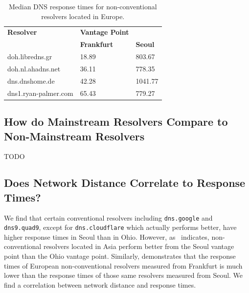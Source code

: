 \begin{table}
\centering
\begin{tabular}{lll}
\toprule
\textbf{Resolver} & \textbf{Vantage Point} & \\
                  & \textbf{Frankfurt}     & \textbf{Seoul} \\
\midrule
doh.libredns.gr      & 18.89                                                        & 803.67                                           \\
doh.nl.ahadns.net    & 36.11                                                        & 778.35                                           \\
dns.dnshome.de       & 42.28                                                        & 1041.77                                           \\ 
dns1.ryan-palmer.com & 65.43                                                        & 779.27                                           \\
\bottomrule
\end{tabular}
\caption{Median DNS response times for non-conventional resolvers located in Europe.}
\label{tab:UnconvEur}
\end{table}

\subsection{How do Mainstream Resolvers Compare to Non-Mainstream Resolvers}
TODO

\subsection{Does Network Distance Correlate to Response Times?}
We find that certain conventional resolvers including \texttt{dns.google} and \texttt{dns9.quad9}, except for \texttt{dns.cloudflare} which actually performs better, have higher response times in Seoul than in Ohio. 
However, as~ indicates, non-conventional resolvers located in Asia perform better from the Seoul vantage point than the Ohio vantage point. 
Similarly,  demonstrates that the response times of European non-conventional resolvers measured from Frankfurt is much lower than the response times of those same resolvers measured from Seoul. 
We find a correlation between network distance and response times. 
